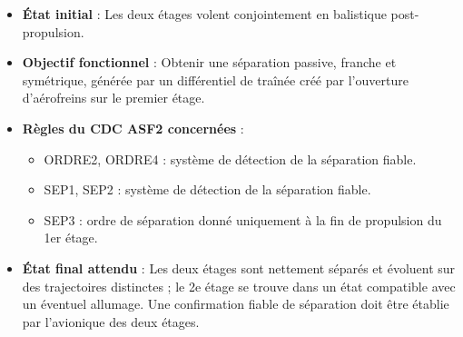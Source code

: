 \begin{itemize}
    \item \textbf{État initial} : Les deux étages volent conjointement en balistique post-propulsion.
    \item \textbf{Objectif fonctionnel} : Obtenir une séparation passive, franche et symétrique, générée par un différentiel
    de traînée créé par l’ouverture d'aérofreins sur le premier étage.
    \item \textbf{Règles du \acrshort{CDC} ASF2 concernées} :
    \begin{itemize}
        \item ORDRE2, ORDRE4\cite[p. ~78-80]{CDC_BiEtage} : système de détection de la séparation fiable.
        \item SEP1, SEP2\cite[p. ~87-88]{CDC_BiEtage} : système de détection de la séparation fiable.
        \item SEP3\cite[p. ~87-88]{CDC_BiEtage} : ordre de séparation donné uniquement à la fin de propulsion du 1er étage.
    \end{itemize}
    \item \textbf{État final attendu} : Les deux étages sont nettement séparés et évoluent sur des trajectoires distinctes ; le
    2e étage se trouve dans un état compatible avec un éventuel allumage. Une confirmation fiable de séparation doit être
    établie par l’avionique des deux étages.
\end{itemize}

\vfill

\newpage

